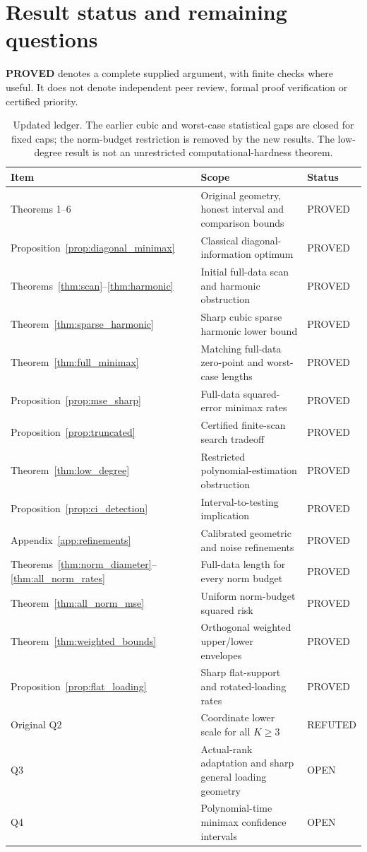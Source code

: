 
\section{Result status and remaining questions}\label{sec:status}
\textbf{PROVED} denotes a complete supplied argument, with finite checks where useful. It does not denote independent peer review, formal proof verification or certified priority.

\begin{table}[ht]
\centering\small
\begin{tabularx}{\textwidth}{@{}lYl@{}}
\toprule Item & Scope & Status\\\midrule
Theorems 1--6 & Original geometry, honest interval and comparison bounds & PROVED\\
Proposition~\ref{prop:diagonal_minimax} & Classical diagonal-information optimum & PROVED\\
Theorems~\ref{thm:scan}--\ref{thm:harmonic} & Initial full-data scan and harmonic obstruction & PROVED\\
Theorem~\ref{thm:sparse_harmonic} & Sharp cubic sparse harmonic lower bound & PROVED\\
Theorem~\ref{thm:full_minimax} & Matching full-data zero-point and worst-case lengths & PROVED\\
Proposition~\ref{prop:mse_sharp} & Full-data squared-error minimax rates & PROVED\\
Proposition~\ref{prop:truncated} & Certified finite-scan search tradeoff & PROVED\\
Theorem~\ref{thm:low_degree} & Restricted polynomial-estimation obstruction & PROVED\\
Proposition~\ref{prop:ci_detection} & Interval-to-testing implication & PROVED\\
Appendix~\ref{app:refinements} & Calibrated geometric and noise refinements & PROVED\\
Theorems~\ref{thm:norm_diameter}--\ref{thm:all_norm_rates} & Full-data length for every norm budget & PROVED\\
Theorem~\ref{thm:all_norm_mse} & Uniform norm-budget squared risk & PROVED\\
Theorem~\ref{thm:weighted_bounds} & Orthogonal weighted upper/lower envelopes & PROVED\\
Proposition~\ref{prop:flat_loading} & Sharp flat-support and rotated-loading rates & PROVED\\
Original Q2 & Coordinate lower scale for all $K\ge3$ & REFUTED\\
Q3 & Actual-rank adaptation and sharp general loading geometry & OPEN\\
Q4 & Polynomial-time minimax confidence intervals & OPEN\\
\bottomrule
\end{tabularx}
\caption{Updated ledger. The earlier cubic and worst-case statistical gaps are closed for fixed caps; the norm-budget restriction is removed by the new results. The low-degree result is not an unrestricted computational-hardness theorem.}\label{tab:status}
\end{table}

